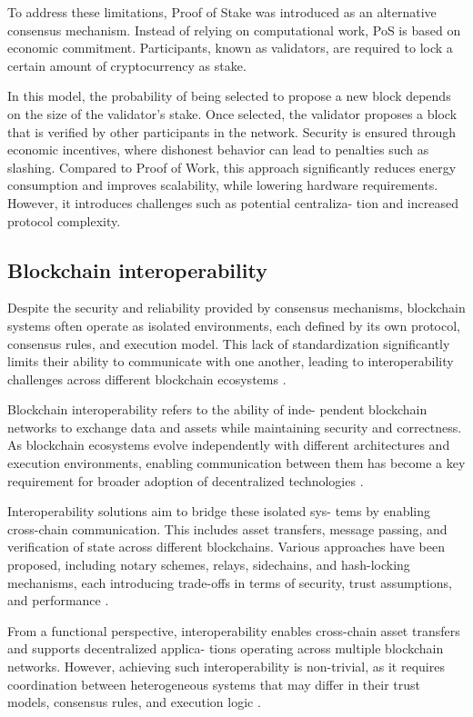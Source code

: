 \documentclass[conference]{IEEEtran}
\begin{document}
To address these limitations, Proof of Stake was introduced
as an alternative consensus mechanism. Instead of relying on
computational work, PoS is based on economic commitment.
Participants, known as validators, are required to lock a certain
amount of cryptocurrency as stake.

In this model, the probability of being selected to propose
a new block depends on the size of the validator’s stake.
Once selected, the validator proposes a block that is verified
by other participants in the network. Security is ensured
through economic incentives, where dishonest behavior can
lead to penalties such as slashing. Compared to Proof of Work,
this approach significantly reduces energy consumption and
improves scalability, while lowering hardware requirements.
However, it introduces challenges such as potential centraliza-
tion and increased protocol complexity.

\subsection{Blockchain interoperability}

Despite the security and reliability provided by consensus
mechanisms, blockchain systems often operate as isolated
environments, each defined by its own protocol, consensus
rules, and execution model. This lack of standardization
significantly limits their ability to communicate with one
another, leading to interoperability challenges across different
blockchain ecosystems \cite{oajaiml-interop, ceur-interop}.

Blockchain interoperability refers to the ability of inde-
pendent blockchain networks to exchange data and assets
while maintaining security and correctness. As blockchain
ecosystems evolve independently with different architectures
and execution environments, enabling communication between
them has become a key requirement for broader adoption of
decentralized technologies \cite{iet2022, mdpi2022}.

Interoperability solutions aim to bridge these isolated sys-
tems by enabling cross-chain communication. This includes
asset transfers, message passing, and verification of state
across different blockchains. Various approaches have been
proposed, including notary schemes, relays, sidechains, and
hash-locking mechanisms, each introducing trade-offs in terms
of security, trust assumptions, and performance \cite{acm2023}.

From a functional perspective, interoperability enables
cross-chain asset transfers and supports decentralized applica-
tions operating across multiple blockchain networks. However,
achieving such interoperability is non-trivial, as it requires
coordination between heterogeneous systems that may differ
in their trust models, consensus rules, and execution logic
\cite{iet2022, acm2023}.
\end{document}
